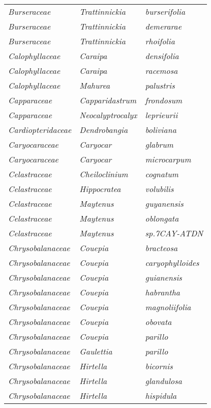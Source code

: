 \documentclass[fleqn,10pt]{ArtEcoFoG} %
\renewenvironment{table}{\begin{table*}}{\end{table*}\ignorespacesafterend}
\begin{document}
\begin{table}
\begin{tabular}[t]{lll}
\addlinespace
\em{Burseraceae} & \em{Trattinnickia} & \em{burserifolia}\\
\em{Burseraceae} & \em{Trattinnickia} & \em{demerarae}\\
\em{Burseraceae} & \em{Trattinnickia} & \em{rhoifolia}\\
\em{Calophyllaceae} & \em{Caraipa} & \em{densifolia}\\
\em{Calophyllaceae} & \em{Caraipa} & \em{racemosa}\\
\addlinespace
\em{Calophyllaceae} & \em{Mahurea} & \em{palustris}\\
\em{Capparaceae} & \em{Capparidastrum} & \em{frondosum}\\
\em{Capparaceae} & \em{Neocalyptrocalyx} & \em{leprieurii}\\
\em{Cardiopteridaceae} & \em{Dendrobangia} & \em{boliviana}\\
\em{Caryocaraceae} & \em{Caryocar} & \em{glabrum}\\
\addlinespace
\em{Caryocaraceae} & \em{Caryocar} & \em{microcarpum}\\
\em{Celastraceae} & \em{Cheiloclinium} & \em{cognatum}\\
\em{Celastraceae} & \em{Hippocratea} & \em{volubilis}\\
\em{Celastraceae} & \em{Maytenus} & \em{guyanensis}\\
\em{Celastraceae} & \em{Maytenus} & \em{oblongata}\\
\addlinespace
\em{Celastraceae} & \em{Maytenus} & \em{sp.7CAY-ATDN}\\
\em{Chrysobalanaceae} & \em{Couepia} & \em{bracteosa}\\
\em{Chrysobalanaceae} & \em{Couepia} & \em{caryophylloides}\\
\em{Chrysobalanaceae} & \em{Couepia} & \em{guianensis}\\
\em{Chrysobalanaceae} & \em{Couepia} & \em{habrantha}\\
\addlinespace
\em{Chrysobalanaceae} & \em{Couepia} & \em{magnoliifolia}\\
\em{Chrysobalanaceae} & \em{Couepia} & \em{obovata}\\
\em{Chrysobalanaceae} & \em{Couepia} & \em{parillo}\\
\em{Chrysobalanaceae} & \em{Gaulettia} & \em{parillo}\\
\em{Chrysobalanaceae} & \em{Hirtella} & \em{bicornis}\\
\addlinespace
\em{Chrysobalanaceae} & \em{Hirtella} & \em{glandulosa}\\
\em{Chrysobalanaceae} & \em{Hirtella} & \em{hispidula}\\

\end{tabular}
\end{table}
\end{document}
